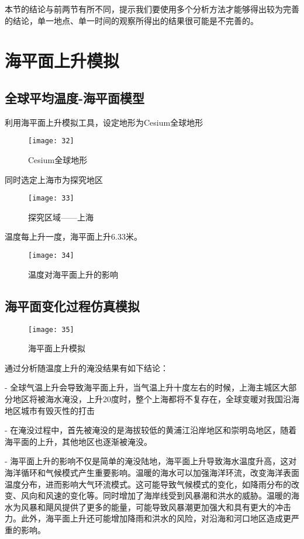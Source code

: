 \documentclass{source/Report}
\begin{document}
本节的结论与前两节有所不同，提示我们要使用多个分析方法才能够得出较为完善的结论，单一地点、单一时间的观察所得出的结果很可能是不完善的。

\section{海平面上升模拟}

\subsection{全球平均温度-海平面模型}

利用海平面上升模拟工具，设定地形为Cesium全球地形

\begin{figure}[H]
    \centering
    \texttt{[image: 32]}
    \caption{Cesium全球地形}
\end{figure}

同时选定上海市为探究地区

\begin{figure}[H]
    \centering
    \texttt{[image: 33]}
    \caption{探究区域——上海}
\end{figure}

温度每上升一度，海平面上升6.33米。

\begin{figure}[H]
    \centering
    \texttt{[image: 34]}
    \caption{温度对海平面上升的影响}
\end{figure}

\subsection{海平面变化过程仿真模拟}

\begin{figure}[H]
    \centering
    \texttt{[image: 35]}
    \caption{海平面上升模拟}
\end{figure}

通过分析随温度上升的淹没结果有如下结论：

- 全球气温上升会导致海平面上升，当气温上升十度左右的时候，上海主城区大部分地区将被海水淹没，上升20度时，整个上海都将不复存在，全球变暖对我国沿海地区城市有毁灭性的打击

- 在淹没过程中，首先被淹没的是海拔较低的黄浦江沿岸地区和崇明岛地区，随着海平面的上升，其他地区也逐渐被淹没。

- 海平面上升的影响不仅是简单的淹没陆地，海平面上升导致海水温度升高，这对海洋循环和气候模式产生重要影响。温暖的海水可以加强海洋环流，改变海洋表面温度分布，进而影响大气环流模式。这可能导致气候模式的变化，如降雨分布的改变、风向和风速的变化等。同时增加了海岸线受到风暴潮和洪水的威胁。温暖的海水为风暴和飓风提供了更多的能量，可能导致风暴潮更加强大和具有更大的冲击力。此外，海平面上升还可能增加降雨和洪水的风险，对沿海和河口地区造成更严重的影响。
\end{document}
